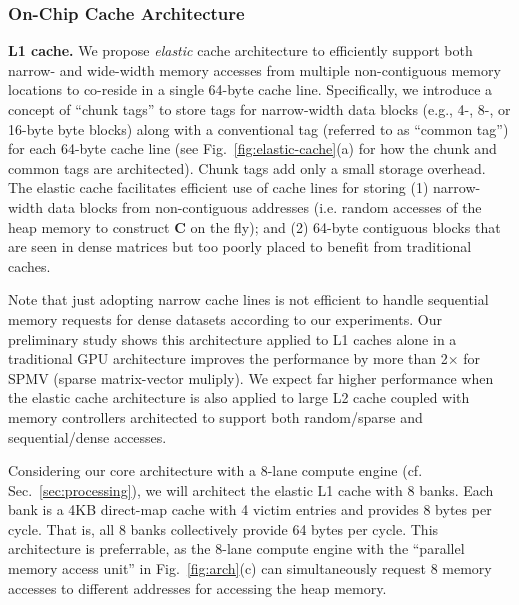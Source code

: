 \subsubsection{On-Chip Cache Architecture} 
\label{sec:memory:on-chip}
\noindent
\textbf{L1 cache.}
We propose \textit{elastic} cache architecture to efficiently support both narrow- and wide-width memory accesses from multiple non-contiguous memory locations to co-reside in a single 64-byte cache line. 
Specifically, we introduce a concept of ``chunk tags'' to store tags for narrow-width data blocks (e.g., 4-, 8-, or 16-byte byte blocks) along with a conventional tag (referred to as ``common tag'') for each 64-byte cache line (see Fig.~\ref{fig:elastic-cache}(a) for how the chunk and common tags are architected).  
Chunk tags add only a small storage overhead. 
The elastic cache facilitates efficient use of cache lines for storing 
(1) narrow-width data blocks from non-contiguous addresses (i.e. random accesses of the heap memory to construct \textbf{C} on the fly); and
(2) 64-byte contiguous blocks that are seen in dense matrices but too poorly placed to benefit from traditional caches. 

Note that just adopting narrow cache lines is not efficient to handle sequential memory requests for dense datasets according to our experiments.
Our preliminary study shows this architecture applied to L1 caches alone in a traditional GPU architecture improves the performance by more than 2$\times$ for SPMV (sparse matrix-vector muliply).
We expect far higher performance when the elastic cache architecture is also applied to large L2 cache coupled with memory controllers architected to support both random/sparse and sequential/dense accesses.




Considering our core architecture with a 8-lane compute engine (cf. Sec.~\ref{sec:processing}), 
we will architect the elastic L1 cache with 8 banks. 
Each bank is a 4KB direct-map cache with 4 victim entries and provides 8 bytes per cycle.
That is, all 8 banks collectively provide 64 bytes per cycle.
This architecture is preferrable, as the 8-lane compute engine with the ``parallel memory access unit'' in Fig.~\ref{fig:arch}(c) can simultaneously request 8 memory accesses to different addresses for accessing the heap memory.

